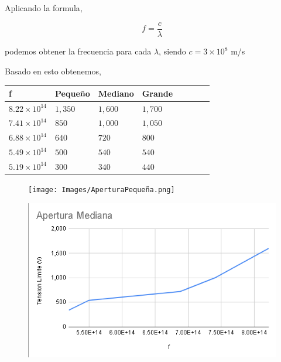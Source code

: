 \documentclass[letterpaper, 12pt]{article}
\begin{document}
\subsection{}

Aplicando la formula,

\begin{equation*}
      f = \frac{c}{\lambda}
\end{equation*}

podemos obtener la frecuencia para cada $\lambda$, siendo
$c = 3 \times 10^{8}$ m/s

Basado en esto obtenemos,

\begin{table}[H]
      \begin{tabularx}{.9\linewidth}{|X|>{\centering\arraybackslash}X|X|>{\centering\arraybackslash}X|X|>{\centering\arraybackslash}X|X|>{\centering\arraybackslash}X|}
            \hline
            f                     & Pequeño & Mediano & Grande  \\\hline
            $8.22 \times 10^{14}$ & $1,350$ & $1,600$ & $1,700$ \\\hline
            $7.41 \times 10^{14}$ & $850$   & $1,000$ & $1,050$ \\\hline
            $6.88 \times 10^{14}$ & $640$   & $720$   & $800$   \\\hline
            $5.49 \times 10^{14}$ & $500$   & $540$   & $540$   \\\hline
            $5.19 \times 10^{14}$ & $300$   & $340$   & $440$   \\\hline
      \end{tabularx}
\end{table}

\begin{figure}[H]
      \begin{center}
            \texttt{[image: Images/AperturaPequeña.png]}
            \caption{}
      \end{center}
\end{figure}

\begin{figure}[H]
      \begin{center}
            \includegraphics[width=.7\linewidth]{Images/AperturaMediana.png}
            \caption{}
      \end{center}
\end{figure}
\end{document}
